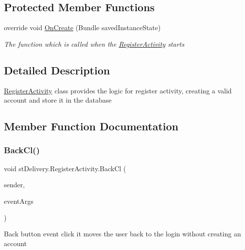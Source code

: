 \subsection*{Protected Member Functions}
\begin{DoxyCompactItemize}
\item 
override void \hyperlink{classst_delivery_1_1_register_activity_a7ac56a2291110ac0f58c15a73636a535}{On\+Create} (Bundle saved\+Instance\+State)
\begin{DoxyCompactList}\small\item\em The function which is called when the \hyperlink{classst_delivery_1_1_register_activity}{Register\+Activity} starts \end{DoxyCompactList}\end{DoxyCompactItemize}


\subsection{Detailed Description}
\hyperlink{classst_delivery_1_1_register_activity}{Register\+Activity} class provides the logic for register activity, creating a valid account and store it in the database 



\subsection{Member Function Documentation}
\mbox{\label{classst_delivery_1_1_register_activity_a49212d8b21bf5b929d4c1da4b8a86e6c}} 
\subsubsection{\texorpdfstring{Back\+Cl()}{BackCl()}}
{\footnotesize\ttfamily void st\+Delivery.\+Register\+Activity.\+Back\+Cl (\begin{DoxyParamCaption}\item[{Object}]{sender,  }\item[{Event\+Args}]{event\+Args }\end{DoxyParamCaption})}



Back button event click it moves the user back to the login without creating an account 

